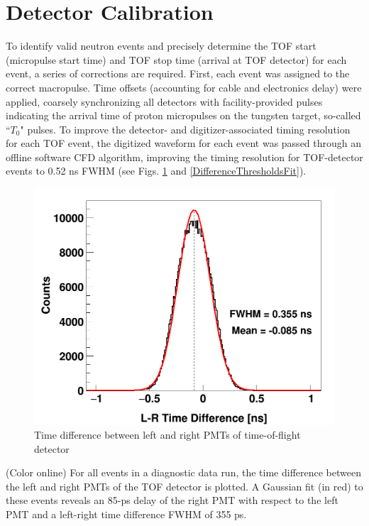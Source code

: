 \section{Detector Calibration}
To identify valid neutron events and precisely determine the TOF start (micropulse start 
time) and TOF stop time (arrival at TOF detector) for each event, a series of corrections 
are required.  First, each event was assigned to the correct macropulse.
Time offsets (accounting for cable and
electronics delay) were applied, coarsely synchronizing all detectors with
facility-provided pulses indicating the arrival time of proton micropulses on the
tungsten target, so-called ``$T_{0}$" pulses.
To improve the detector- and digitizer-associated timing resolution for each TOF
event, the digitized waveform for each event was passed 
through an offline software CFD algorithm, improving the timing resolution 
for TOF-detector events to 0.52 ns FWHM (see Figs. \ref{LRTimeDifferenceLinear}
and \ref{DifferenceThresholdsFit}).

\begin{figure}
    \includegraphics[scale=0.3]{figures/Difference_Linear.png}
    \caption{Time difference between left and right PMTs of time-of-flight detector}
    \label{LRTimeDifferenceLinear}
\end{figure}

(Color online) For all events in a diagnostic data run, the time difference   
        between the left and right PMTs of the TOF detector is plotted.
        A Gaussian fit (in red) to these events reveals an 85-ps delay of the right PMT with 
    respect to the left PMT and a left-right time difference FWHM of 355 ps.

